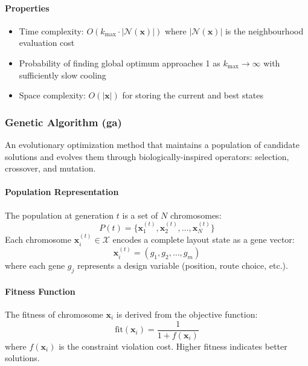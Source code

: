 \documentclass{report}
\begin{document}
\paragraph{Properties}
\begin{itemize}
\item Time complexity: $O(k_{\max} \cdot |\mathcal{N}(\mathbf{x})|)$ where $|\mathcal{N}(\mathbf{x})|$ is the neighbourhood evaluation cost
\item Probability of finding global optimum approaches 1 as $k_{\max} \rightarrow \infty$ with sufficiently slow cooling
\item Space complexity: $O(|\mathbf{x}|)$ for storing the current and best states
\end{itemize}

\subsubsection{Genetic Algorithm (ga)}
An evolutionary optimization method that maintains a population of candidate solutions and evolves them through biologically-inspired operators: selection, crossover, and mutation.

\paragraph{Population Representation}
The population at generation $t$ is a set of $N$ chromosomes:
\begin{equation}
P(t) = \{\mathbf{x}_1^{(t)}, \mathbf{x}_2^{(t)}, \ldots, \mathbf{x}_N^{(t)}\}
\end{equation}
Each chromosome $\mathbf{x}_i^{(t)} \in \mathcal{X}$ encodes a complete layout state as a gene vector:
\begin{equation}
\mathbf{x}_i^{(t)} = (g_1, g_2, \ldots, g_m)
\end{equation}
where each gene $g_j$ represents a design variable (position, route choice, etc.).

\paragraph{Fitness Function}
The fitness of chromosome $\mathbf{x}_i$ is derived from the objective function:
\begin{equation}
\text{fit}(\mathbf{x}_i) = \frac{1}{1 + f(\mathbf{x}_i)}
\end{equation}
where $f(\mathbf{x}_i)$ is the constraint violation cost. Higher fitness indicates better solutions.
\end{document}
